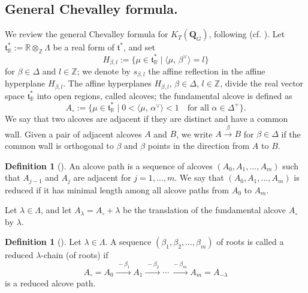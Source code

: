 \documentclass[11pt,a4paper,reqno,dvipdfmx]{amsart}
\numberwithin{equation}{section}
\newcommand{\Ft}{\mathfrak{t}}
\newcommand{\BZ}{\mathbb{Z}}
\newcommand{\BR}{\mathbb{R}}
\newcommand{\edge}[1]{ \xrightarrow{\hspace{2pt}#1\hspace{2pt}} }
\newcommand{\pair}[2]{\langle #1,\,#2 \rangle}
\newcommand{\QG}{\mathbf{Q}_{G}}
\theoremstyle{plain}
\theoremstyle{definition}
\newtheorem{dfn}[lem]{Definition}
\theoremstyle{remark}
\begin{document}
\subsection{General Chevalley formula.}
\label{subsec:genChev}

We review the general Chevalley formula for 
$K_{T}(\QG)$, following \cite{LNS} (cf. \cite[Theorem~5.16]{KoLN}). 
Let $\Ft^{\ast}_{\BR} :=\BR \otimes_{\BZ} \Lambda$ be a real form of $\Ft^{\ast}$, 
and set 
%
\begin{equation*}
	H_{\beta,l}:=\bigl\{ \mu \in \Ft^{\ast}_{\BR} \mid \pair{\mu}{\beta^\vee} =l\bigr\} 
\end{equation*}
%
for $\beta \in \Delta$ and $l \in \BZ$; we denote by $s_{\beta,l}$ the affine reflection in the affine hyperplane $H_{\beta,l}$.
The affine hyperplanes $H_{\beta,l}$, $\beta \in \Delta$, $l \in \BZ$, divide 
the real vector space $\Ft^{\ast}_{\BR}$ into open regions, called alcoves; 
the fundamental alcove is defined as
%
\begin{equation*}
	A_{\circ} := \bigl\{ \mu \in \Ft_{\BR}^{\ast} \mid 
	0 < \pair{\mu}{\alpha^\vee} < 1 \quad \text{for all $\alpha \in \Delta^{+}$} \bigr\}.
\end{equation*}
%
We say that two alcoves are adjacent if they are distinct and have a common wall. Given a pair
of adjacent alcoves $A$ and $B$, we write $A \edge{\beta} B$  for $\beta \in \Delta$ if the
common wall is orthogonal to $\beta$ and $\beta$ points in the direction from $A$ to $B$.

\begin{dfn}[\cite{LP}]
	An alcove path is a sequence of alcoves $(A_0, A_1, \ldots, A_m)$ such that
	$A_{j-1}$ and $A_j$ are adjacent for $j=1,\ldots,m$. 
	We say that $(A_0, A_1, \ldots, A_m)$ is reduced 
	if it has minimal length among all alcove paths from $A_0$ to $A_m$.
\end{dfn}

Let $\lambda \in \Lambda$, and let $A_{\lambda}=A_{\circ}+\lambda$ be 
the translation of the fundamental alcove $A_{\circ}$ by $\lambda$. 
	
\begin{dfn}[\cite{LP}] \label{dfn:lch}
    Let $\lambda \in \Lambda$. 
	A sequence $(\beta_1, \beta_2, \dots, \beta_m)$ of roots is called 
	a reduced $\lambda$-chain (of roots) if 
%
	\begin{equation}
		A_{\circ}=A_{0} \edge{-\beta_1}  A_1
		\edge{-\beta_2} \cdots 
		\edge{-\beta_m}  A_m=A_{-\lambda}
	\end{equation}
%
is a reduced alcove path.
\end{dfn}
\end{document}
